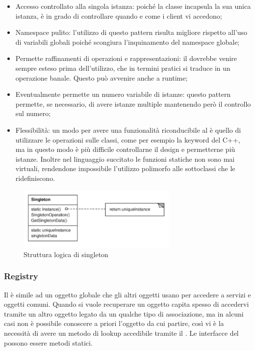\begin{itemize}

	\item Accesso controllato alla singola istanza: poiché la classe  incapsula la sua unica istanza, è in grado di controllare quando e come i client vi accedono;
	\item Namespace pulito: l'utilizzo di questo pattern risulta migliore rispetto all'uso di variabili globali poiché scongiura l'inquinamento del namespace globale;
	\item Permette raffinamenti di operazioni e rappresentazioni: il  dovrebbe venire sempre esteso prima dell'utilizzo, che in termini pratici si traduce in un operazione banale. Questo può avvenire anche a runtime;
	\item Eventualmente permette un numero variabile di istanze: questo pattern permette, se necessario, di avere istanze multiple mantenendo però il controllo sul numero;
	\item Flessibilità: un modo per avere una funzionalità riconducibile al  è quello di utilizzare le operazioni sulle classi, come per esempio la keyword  del C++, ma in questo modo è più difficile controllarne il design e permetterne più istanze. Inoltre nel linguaggio succitato le funzioni statiche non sono mai virtuali, rendendone impossibile l'utilizzo polimorfo alle sottoclassi che le ridefiniscono.
	
\end{itemize}

\begin{figure}[h]
\centering \includegraphics[width=0.7\textwidth]{patterns/Singleton.png}
\caption{Struttura logica di singleton}
\end{figure}

\subsubsection{Registry} %

Il  è simile ad un oggetto globale che gli altri oggetti usano per accedere a servizi e oggetti comuni. Quando si vuole recuperare un oggetto capita spesso di accedervi tramite un altro oggetto legato da un qualche tipo di associazione, ma in alcuni casi non è possibile conoscere a priori l'oggetto da cui partire, così vi è la necessità di avere un metodo di lookup accedibile tramite il . Le interfacce del  possono essere metodi statici.

